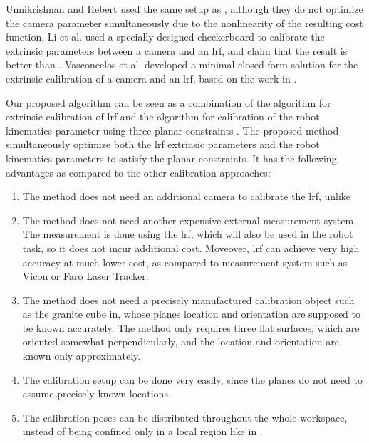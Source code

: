 Unnikrishnan and Hebert \cite{Unnikrishnan2005} used the same setup as \cite{Zhang2004}, although they do not optimize the camera parameter simultaneously due to the nonlinearity of the resulting cost function. 
Li et al. \cite{Li2007} used a specially designed checkerboard to calibrate the extrinsic parameters between a camera and an \ac{lrf}, and claim that the result is better than \cite{Zhang2004}. Vasconcelos et al. \cite{Vasconcelos2012} developed a minimal closed-form solution for the extrinsic calibration of a camera and an \ac{lrf}, based on the work in \cite{Zhang2004}. 

Our proposed algorithm can be seen as a combination of the algorithm for extrinsic calibration of \ac{lrf} \cite{Zhang2004} and the algorithm for calibration of the robot kinematics parameter using three planar constraints \cite{Joubair2015}. The proposed method simultaneously optimize both the \ac{lrf} extrinsic parameters and the robot kinematics parameters to satisfy the planar constraints. It has the following advantages as compared to the other calibration approaches:
\begin{enumerate}
\item The method does not need an additional camera to calibrate the \ac{lrf}, unlike \cite{Zhang2004}
\item The method does not need another expensive external measurement system. The measurement is done using the \ac{lrf}, which will also be used in the robot task, so it does not incur additional cost. Moveover, \ac{lrf} can achieve very high accuracy at much lower cost, as compared to measurement system such as Vicon or Faro Laser Tracker. 
\item The method does not need a precisely manufactured calibration object such as the granite cube in\cite{Joubair2015}, whose planes location and orientation are supposed to be known accurately. The method only requires
three flat surfaces, which are oriented somewhat perpendicularly, and the location and orientation are known only approximately. 
\item The calibration setup can be done very easily, since the planes do not need to assume precisely known locations.  
\item The calibration poses can be distributed throughout the whole workspace, instead of being confined only in a local region like in \cite{Joubair2015}. 
\end{enumerate}



